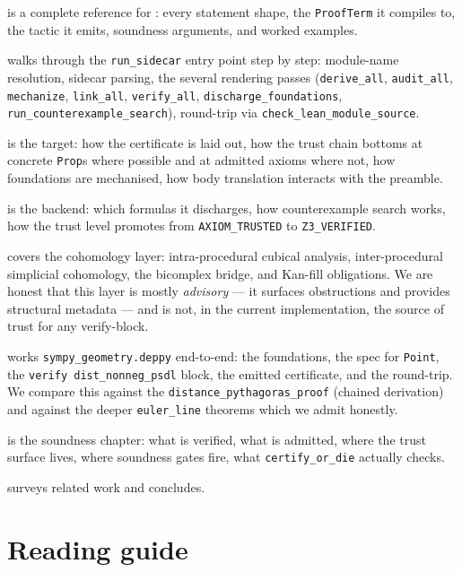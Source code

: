  is a complete reference for \PSDL{}: every statement
shape, the \texttt{ProofTerm} it compiles to, the \Lean{} tactic it
emits, soundness arguments, and worked examples.

 walks through the \texttt{run\_sidecar} entry
point step by step: module-name resolution, sidecar parsing, the
several rendering passes (\texttt{derive\_all},
\texttt{audit\_all}, \texttt{mechanize}, \texttt{link\_all},
\texttt{verify\_all}, \texttt{discharge\_foundations},
\texttt{run\_counterexample\_search}), \Lean{} round-trip via
\texttt{check\_lean\_module\_source}.

 is the \Lean{} target: how the certificate is laid
out, how the trust chain bottoms at concrete \Lean{} \texttt{Prop}s
where possible and at admitted axioms where not, how foundations are
mechanised, how body translation interacts with the preamble.

 is the \Zthree{} backend: which formulas it discharges,
how counterexample search works, how the trust level promotes from
\texttt{AXIOM\_TRUSTED} to \texttt{Z3\_VERIFIED}.

 covers the cohomology layer:
intra-procedural cubical analysis, inter-procedural simplicial
cohomology, the bicomplex bridge, and Kan-fill obligations.  We are
honest that this layer is mostly \emph{advisory} --- it surfaces
obstructions and provides structural metadata --- and is not, in the
current implementation, the source of trust for any verify-block.

 works \texttt{sympy\_geometry.deppy} end-to-end:
the foundations, the spec for \texttt{Point}, the
\texttt{verify dist\_nonneg\_psdl} block, the emitted certificate, and
the \Lean{} round-trip.  We compare this against the
\texttt{distance\_pythagoras\_proof} (chained derivation) and against
the deeper \texttt{euler\_line} theorems which we admit honestly.

 is the soundness chapter: what is verified, what
is admitted, where the trust surface lives, where soundness gates
fire, what \texttt{certify\_or\_die} actually checks.

 surveys related work and concludes.

\section{Reading guide}
\label{sec:reading-guide}

